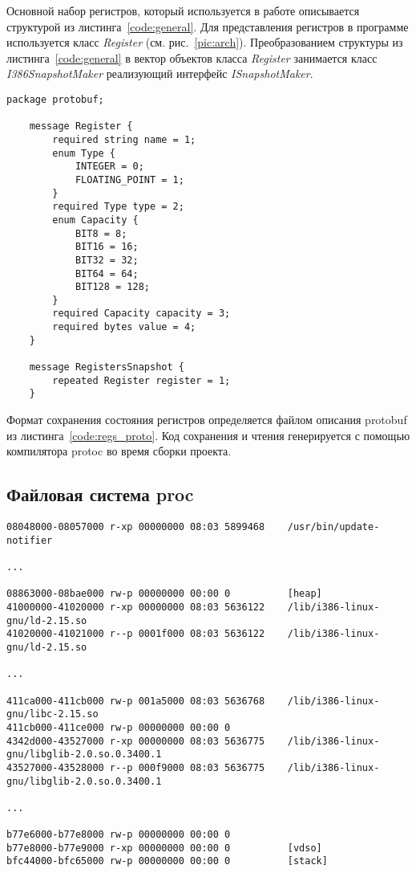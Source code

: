 Основной набор регистров, который используется в работе описывается структурой из листинга~\ref{code:general}. Для представления регистров в программе используется класс \textit{Register} (см. рис.~\ref{pic:arch}). Преобразованием структуры из листинга~\ref{code:general} в вектор объектов класса \textit{Register} занимается класс \textit{I386SnapshotMaker} реализующий интерфейс \textit{ISnapshotMaker}.

\begin{lstlisting}[caption=Формат сохранения регистров, label=code:regs_proto]
    package protobuf;

    message Register {
        required string name = 1;
        enum Type {
            INTEGER = 0;
            FLOATING_POINT = 1;
        }
        required Type type = 2;
        enum Capacity {
            BIT8 = 8;
            BIT16 = 16;
            BIT32 = 32;
            BIT64 = 64;
            BIT128 = 128;
        }
        required Capacity capacity = 3;
        required bytes value = 4;
    }

    message RegistersSnapshot {
        repeated Register register = 1;
    }
\end{lstlisting}

Формат сохранения состояния регистров определяется файлом описания protobuf из листинга~\ref{code:regs_proto}. Код сохранения и чтения генерируется с помощью компилятора protoc во время сборки проекта.


\subsection{Файловая система proc}

\begin{lstlisting}[caption=Формат файла maps, label=code:maps]
08048000-08057000 r-xp 00000000 08:03 5899468    /usr/bin/update-notifier

...

08863000-08bae000 rw-p 00000000 00:00 0          [heap]
41000000-41020000 r-xp 00000000 08:03 5636122    /lib/i386-linux-gnu/ld-2.15.so
41020000-41021000 r--p 0001f000 08:03 5636122    /lib/i386-linux-gnu/ld-2.15.so

...

411ca000-411cb000 rw-p 001a5000 08:03 5636768    /lib/i386-linux-gnu/libc-2.15.so
411cb000-411ce000 rw-p 00000000 00:00 0 
4342d000-43527000 r-xp 00000000 08:03 5636775    /lib/i386-linux-gnu/libglib-2.0.so.0.3400.1
43527000-43528000 r--p 000f9000 08:03 5636775    /lib/i386-linux-gnu/libglib-2.0.so.0.3400.1

...

b77e6000-b77e8000 rw-p 00000000 00:00 0 
b77e8000-b77e9000 r-xp 00000000 00:00 0          [vdso]
bfc44000-bfc65000 rw-p 00000000 00:00 0          [stack]
\end{lstlisting}

